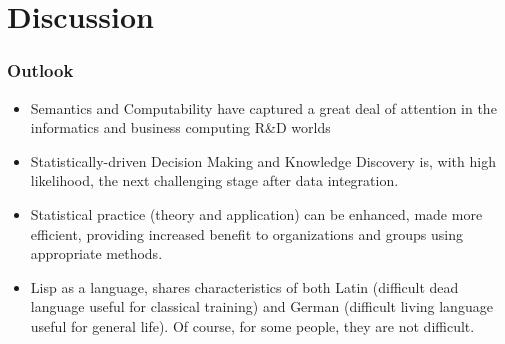 \documentclass{beamer}
\begin{document}
\section{Discussion}

\begin{frame}
  \frametitle{Outlook}
  \begin{itemize}
  \item Semantics and Computability have captured a great deal of
    attention in the informatics and business computing R\&D worlds
  \item Statistically-driven Decision Making and Knowledge Discovery
    is, with high likelihood, the next challenging stage after data
    integration.
  \item Statistical practice (theory and application) can be enhanced,
    made more efficient, providing  increased benefit to organizations
    and groups using appropriate methods.
  \item Lisp as a language, shares characteristics of both Latin
    (difficult dead language useful for classical training) and German
    (difficult living language useful for general life).  Of course,
    for some people, they are not difficult.
  \end{itemize}

\end{frame}
\end{document}
